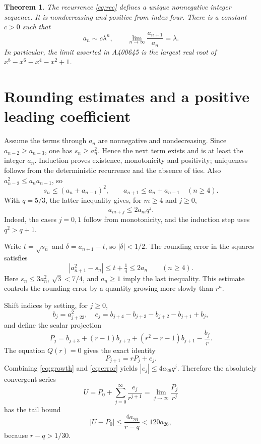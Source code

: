 \documentclass[11pt]{article}
\newtheorem{theorem}{Theorem}
\begin{document}
\begin{theorem}\label{thm:main}
The recurrence \eqref{eq:rec} defines a unique nonnegative integer
sequence. It is nondecreasing and positive from index four. There is a
constant $c>0$ such that
\[
 a_n\sim c\lambda^n,\qquad
 \lim_{n\to\infty}\frac{a_{n+1}}{a_n}=\lambda.
\]
In particular, the limit asserted in A400645 is the largest real root of
$x^8-x^6-x^4-x^2+1$.
\end{theorem}

\section{Rounding estimates and a positive leading coefficient}
Assume the terms through $a_n$ are nonnegative and nondecreasing. Since
$a_{n-2}\ge a_{n-3}$, one has $s_n\ge a_n^2$. Hence the next term exists
and is at least the integer $a_n$. Induction proves existence,
monotonicity and positivity; uniqueness follows from the deterministic
recurrence and the absence of ties.
Also $a_{n-2}^2\le a_na_{n-1}$, so
\[
 s_n\le (a_n+a_{n-1})^2,\qquad
 a_{n+1}\le a_n+a_{n-1}\quad(n\ge4).
\]
With $q=5/3$, the latter inequality gives, for $m\ge4$ and $j\ge0$,
\begin{equation}\label{eq:growth}
 a_{m+j}\le 2a_m q^j.
\end{equation}
Indeed, the cases $j=0,1$ follow from monotonicity, and the induction
step uses $q^2>q+1$.

Write $t=\sqrt{s_n}$ and $\delta=a_{n+1}-t$, so $|\delta|<1/2$.
The rounding error in the squares satisfies
\begin{equation}\label{eq:error}
 |a_{n+1}^2-s_n|
 \le t+\tfrac14\le 2a_n\qquad(n\ge4).
\end{equation}
Here $s_n\le3a_n^2$, $\sqrt3<7/4$, and $a_n\ge1$ imply the last
inequality. This estimate controls the rounding error by a quantity
growing more slowly than $r^n$.

Shift indices by setting, for $j\ge0$,
\[
 b_j=a_{j+23}^2,\quad
 e_j=b_{j+4}-b_{j+3}-b_{j+2}-b_{j+1}+b_j,
\]
and define the scalar projection
\begin{equation}\label{eq:projection}
 P_j=b_{j+3}+(r-1)b_{j+2}+(r^2-r-1)b_{j+1}-\frac{b_j}{r}.
\end{equation}
The equation $Q(r)=0$ gives the exact identity
\begin{equation}\label{eq:step}
 P_{j+1}=rP_j+e_j.
\end{equation}
Combining \eqref{eq:growth} and \eqref{eq:error} yields
$|e_j|\le4a_{26}q^j$. Therefore the absolutely convergent series
\begin{equation}\label{eq:U}
 U=P_0+\sum_{j=0}^{\infty}\frac{e_j}{r^{j+1}}
   =\lim_{j\to\infty}\frac{P_j}{r^j}
\end{equation}
has the tail bound
\begin{equation}\label{eq:tail}
 |U-P_0|\le\frac{4a_{26}}{r-q}<120a_{26},
\end{equation}
because $r-q>1/30$.
\end{document}
